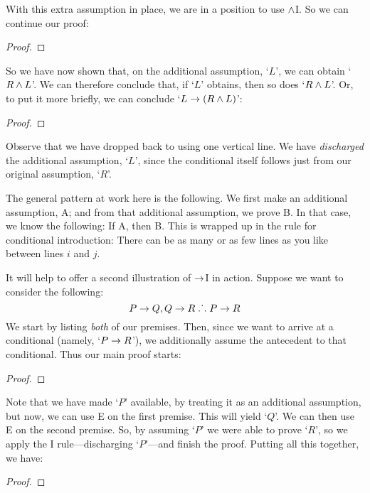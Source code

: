 With this extra assumption in place, we are in a position to use $\wedge$I. So we can continue our proof:
	\begin{proof}
		\open
	\end{proof}
So we have now shown that, on the additional assumption, `$L$', we can obtain `$R \wedge L$'. We can therefore conclude that, if `$L$' obtains, then so does `$R \wedge L$'. Or, to put it more briefly, we can conclude `$L \rightarrow (R \wedge L)$':
	\begin{proof}
		\open
			\close
	\end{proof}
Observe that we have dropped back to using one vertical line.  We have \emph{discharged} the additional assumption, `$L$', since the conditional itself follows just from our original assumption, `$R$'.

The general pattern at work here is the following. We first make an additional assumption, A; and from that additional assumption, we prove B. In that case, we know the following: If A, then B. This is wrapped up in the rule for conditional introduction:
There can be as many or as few lines as you like between lines $i$ and $j$. 

It will help to offer a second  illustration of $\rightarrow$I in action. Suppose we want to consider the following:
	$$P \rightarrow Q, Q \rightarrow R \mathrel{\ldotp\dot{}\,\ldotp} P \rightarrow R$$
We start by listing \emph{both} of our premises. Then, since we want to arrive at a conditional (namely, `$P \rightarrow R$'), we additionally assume the antecedent to that conditional. Thus our main proof starts:
\begin{proof}
	\open
	\close
\end{proof}
Note that we have made `$P$' available, by treating it as an additional assumption, but now, we can use {\eif}E on the first premise. This will yield `$Q$'. We can then use {\eif}E on the second premise. So, by assuming `$P$' we were able to prove `$R$', so we apply the {\eif}I rule---discharging `$P$'---and finish the proof. Putting all this together, we have:
\label{HSproof}
\begin{proof}
	\open
	\close
\end{proof}


